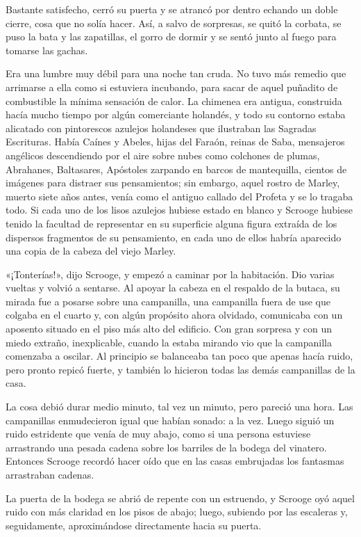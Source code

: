 \documentclass{novela}
\begin{document}
 Bastante satisfecho, cerró su puerta y se atrancó por dentro echando un doble cierre, cosa que no solía hacer. Así, a salvo de sorpresas, se quitó la corbata, se puso la bata y las zapatillas, el gorro de dormir y se sentó junto al fuego para tomarse las gachas.

 Era una lumbre muy débil para una noche tan cruda. No tuvo más remedio que arrimarse a ella como si estuviera incubando, para sacar de aquel puñadito de combustible la mínima sensación de calor. La chimenea era antigua, construida hacía mucho tiempo por algún comerciante holandés, y todo su contorno estaba alicatado con pintorescos azulejos holandeses que ilustraban las Sagradas Escrituras. Había Caínes y Abeles, hijas del Faraón, reinas de Saba, mensajeros angélicos descendiendo por el aire sobre nubes como colchones de plumas, Abrahanes, Baltasares, Apóstoles zarpando en barcos de mantequilla, cientos de imágenes para distraer sus pensamientos; sin embargo, aquel rostro de Marley, muerto siete años antes, venía como el antiguo callado del Profeta y se lo tragaba todo. Si cada uno de los lisos azulejos hubiese estado en blanco y Scrooge hubiese tenido la facultad de representar en su superficie alguna figura extraída de los dispersos fragmentos de su pensamiento, en cada uno de ellos habría aparecido una copia de la cabeza del viejo Marley.

 «¡Tonterías!», dijo Scrooge, y empezó a caminar por la habitación. Dio varias vueltas y volvió a sentarse. Al apoyar la cabeza en el respaldo de la butaca, su mirada fue a posarse sobre una campanilla, una campanilla fuera de use que colgaba en el cuarto y, con algún propósito ahora olvidado, comunicaba con un aposento situado en el piso más alto del edificio. Con gran sorpresa y con un miedo extraño, inexplicable, cuando la estaba mirando vio que la campanilla comenzaba a oscilar. Al principio se balanceaba tan poco que apenas hacía ruido, pero pronto repicó fuerte, y también lo hicieron todas las demás campanillas de la casa.

 La cosa debió durar medio minuto, tal vez un minuto, pero pareció una hora. Las campanillas enmudecieron igual que habían sonado: a la vez. Luego siguió un ruido estridente que venía de muy abajo, como si una persona estuviese arrastrando una pesada cadena sobre los barriles de la bodega del vinatero. Entonces Scrooge recordó hacer oído que en las casas embrujadas los fantasmas arrastraban cadenas.

 La puerta de la bodega se abrió de repente con un estruendo, y Scrooge oyó aquel ruido con más claridad en los pisos de abajo; luego, subiendo por las escaleras y, seguidamente, aproximándose directamente hacia su puerta.
\end{document}
